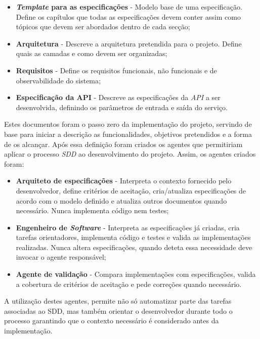 		\begin{itemize}
			\item \textbf{\textit{Template} para as especificações} - Modelo base de uma especificação. Define os capítulos que todas as especificações devem conter assim como tópicos que devem ser abordados dentro de cada secção;
			\item \textbf{Arquitetura} - Descreve a arquitetura pretendida para o projeto. Define quais as camadas e como devem ser organizadas;
			\item \textbf{Requisitos} - Define os requisitos funcionais, não funcionais e de observabilidade do sistema;
			\item \textbf{Especificação da API} - Descreve as especificações da \textit{API} a ser desenvolvida, definindo os parâmetros de entrada e saída do serviço.
		\end{itemize}
		
		Estes documentos foram o passo zero da implementação do projeto, servindo de base para iniciar a descrição as funcionalidades, objetivos pretendidos e a forma de os alcançar.
		Após essa definição foram criados os agentes que permitiriam aplicar o processo \textit{SDD} ao desenvolvimento do projeto. Assim, os agentes criados foram:
		
		\begin{itemize}
			\item \textbf{Arquiteto de especificações} - Interpreta o contexto fornecido pelo desenvolvedor, define critérios de aceitação, cria/atualiza especificações de acordo com o modelo definido e atualiza outros documentos quando necessário. Nunca implementa código nem testes;
			\item \textbf{Engenheiro de \textit{Software}} - Interpreta as especificações já criadas, cria tarefas orientadores, implementa código e testes e valida as implementações realizadas. Nunca altera especificações, quando deteta essa necessidade deve invocar o agente responsável;
			\item \textbf{Agente de validação} - Compara implementações com especificações, valida a cobertura de critérios de aceitação e pede correções quando necessário.
		\end{itemize}
		
		A utilização destes agentes, permite não só automatizar parte das tarefas associadas ao \gls{SDD}, mas também orientar o desenvolvedor durante todo o processo garantindo que o contexto necessário é considerado antes da implementação.
	
